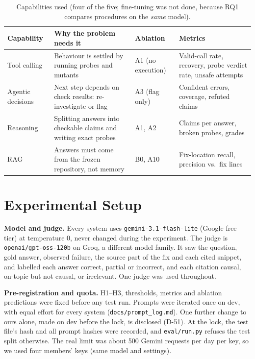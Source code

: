 \documentclass[10pt,a4paper]{article}
\newcommand{\code}[1]{\texttt{\small #1}}
\begin{document}
\begin{table}[!htb]
\centering\footnotesize
\caption{Capabilities used (four of the five; fine-tuning was not done, because RQ1 compares procedures on the
\emph{same} model).}
\begin{tabularx}{\linewidth}{@{}l Y l Y@{}}
\toprule
Capability & Why the problem needs it & Ablation & Metrics\\
\midrule
Tool calling & Behaviour is settled by running probes and mutants & A1 (no execution) & Valid-call rate, recovery, probe verdict rate, unsafe attempts\\
Agentic decisions & Next step depends on check results: re-investigate or flag & A3 (flag only) & Confident errors, coverage, refuted claims\\
Reasoning & Splitting answers into checkable claims and writing exact probes & A1, A2 & Claims per answer, broken probes, grades\\
RAG & Answers must come from the frozen repository, not memory & B0, A10 & Fix-location recall, precision vs.\ fix lines\\
\bottomrule
\end{tabularx}
\end{table}

\section{Experimental Setup}

\textbf{Model and judge.} Every system uses \code{gemini-3.1-flash-lite} (Google free tier) at temperature 0, never
changed during the experiment. The judge is \code{openai/gpt-oss-120b} on Groq, a different model family. It saw the
question, gold answer, observed failure, the source part of the fix and each cited snippet, and labelled each answer
correct, partial or incorrect, and each citation causal, on-topic but not causal, or irrelevant. One judge was used
throughout.

\textbf{Pre-registration and quota.} H1--H3, thresholds, metrics and ablation predictions were fixed before any test
run. Prompts were iterated once on dev, with equal effort for every system (\code{docs/prompt\_log.md}). One further
change to ours alone, made on dev before the lock, is disclosed (D-51). At the lock, the test file's hash and all prompt
hashes were recorded, and \code{eval/run.py} refuses the test split otherwise. The real limit was about 500 Gemini
requests per day per key, so we used four members' keys (same model and settings).
\end{document}
